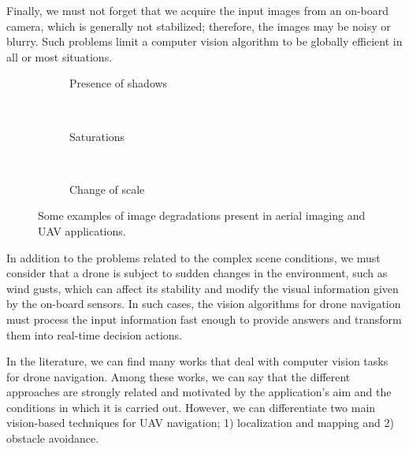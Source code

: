Finally, we must not forget that we acquire the input images from an on-board camera, which is generally not stabilized; therefore, the images may be noisy or blurry. Such problems limit a computer vision algorithm to be globally efficient in all or most situations.


\begin{figure}[!ht]
    \centering
    \begin{subfigure}[b]{0.38\textwidth}
        \caption{Presence of shadows}
    \end{subfigure}
        ~ %
    \begin{subfigure}[b]{0.38\textwidth}
        \caption{Saturations}
    \end{subfigure}
        ~ %
    \begin{subfigure}[b]{0.38\textwidth}
        \caption{Change of scale}
    \end{subfigure} 
    \caption{Some examples of image degradations present in aerial imaging and UAV applications.}\label{fig:img_drone_degradations}
\end{figure}

In addition to the problems related to the complex scene conditions, we must consider that a drone is subject to sudden changes in the environment, such as wind gusts, which can affect its stability and modify the visual information given by the on-board sensors. In such cases, the vision algorithms for drone navigation must process the input information fast enough to provide answers and transform them into real-time decision actions.

In the literature, we can find many works that deal with computer vision tasks for drone navigation. Among these works, we can say that the different approaches are strongly related and motivated by the application's aim and the conditions in which it is carried out. However, we can differentiate two main vision-based techniques for UAV navigation; 1) localization and mapping and 2) obstacle avoidance.

